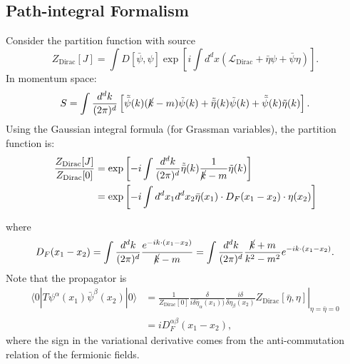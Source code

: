 \subsection{Path-integral Formalism}

Consider the partition function with source
\begin{equation}
	Z_{\mathrm{Dirac}}[J]
	= \int D[\bar\psi,\psi] \exp\left[i\int d^dx \left(\mathcal{L}_{\mathrm{Dirac}}+\bar{\eta}\psi + \bar\psi\eta \right) \right].
\end{equation}
In momentum space:
\begin{equation}
	S = \int\frac{d^d k}{(2\pi)^d} \left[
		\tilde{\bar\psi}(k)(\cancel{k}-m)\tilde{\psi}(k) +
		\tilde{\bar\eta}(k) \tilde{\psi}(k) +
		\tilde{\bar\psi}(k) \tilde{\eta}(k)
	\right].
\end{equation}
Using the Gaussian integral formula (for Grassman variables), the partition function is:
\begin{equation}
\begin{aligned}
	\frac{Z_{\mathrm{Dirac}}[J]}{Z_{\mathrm{Dirac}}[0]}
	&= \exp\left[-i\int \frac{d^d k}{(2\pi)^d} \tilde{\bar\eta}(k)\frac{1}{\cancel{k}-m}\tilde\eta(k)\right] \\
	&= \exp\left[-i\int d^dx_1 d^d x_2 \bar{\eta}(x_1)\cdot D_F(x_1-x_2)\cdot \eta(x_2) \right]
\end{aligned}
\end{equation}

where
\begin{equation}
	D_F(x_1-x_2) = \int \frac{d^d k}{(2\pi)^d} \frac{e^{-i k \cdot (x_1-x_2)}}{\cancel{k}-m}
	= \int \frac{d^d k}{(2\pi)^d} \frac{\cancel{k}+m}{k^2-m^2} e^{-i k \cdot (x_1-x_2)}.
\end{equation}
Note that the propagator is
\begin{equation}
\begin{aligned}
	\langle 0| T \psi^\alpha(x_1) \bar\psi^\beta(x_2) |0\rangle
	&= \left.\frac{1}{Z_{\mathrm{Dirac}}[0]}\frac{\delta}{i\delta \bar{\eta}_\alpha(x_1))}\frac{i\delta}{\delta\eta_\beta(x_2)} Z_{\mathrm{Dirac}}[\bar\eta,\eta]\right|_{\eta=\bar\eta=0} \\
	&= i D^{\alpha\beta}_F(x_1-x_2),
\end{aligned}
\end{equation}
where the sign in the variational derivative comes from the anti-commutation relation of the fermionic fields.


